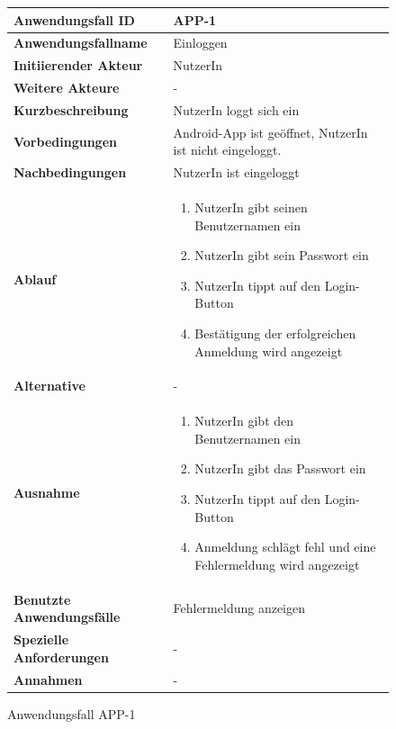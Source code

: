 \newpage

\begin{figure}[h]
	\centering
	\begin{tabularx}{\textwidth}{ X | X }
		\textbf{Anwendungsfall ID} & APP-1 \\ \hline
		\textbf{Anwendungsfallname} & Einloggen \\ \hline
		\textbf{Initiierender Akteur} & NutzerIn \\ \hline
		\textbf{Weitere Akteure} & -  \\ \hline
		\textbf{Kurzbeschreibung} & NutzerIn loggt sich ein \\ \hline
		\textbf{Vorbedingungen} & Android-App ist geöffnet, NutzerIn ist nicht eingeloggt. \\ \hline
		\textbf{Nachbedingungen} & NutzerIn ist eingeloggt \\ \hline
		\textbf{Ablauf} &
			\begin{enumerate}
				\item NutzerIn gibt seinen Benutzernamen ein
				\item NutzerIn gibt sein Passwort ein
				\item NutzerIn tippt auf den Login-Button
				\item Bestätigung der erfolgreichen Anmeldung wird angezeigt
			\end{enumerate} \\ \hline
		\textbf{Alternative} &
				- \\ \hline
		\textbf{Ausnahme} &
				\begin{enumerate}
					\item NutzerIn gibt den Benutzernamen ein
					\item NutzerIn gibt das Passwort ein
					\item NutzerIn tippt auf den Login-Button
					\item Anmeldung schlägt fehl und eine Fehlermeldung wird angezeigt
				\end{enumerate}  \\ \hline
		\textbf{Benutzte Anwendungsfälle} & Fehlermeldung anzeigen \\ \hline
		\textbf{Spezielle Anforderungen} & - \\ \hline
		\textbf{Annahmen} & -
	\end{tabularx}
	\caption{Anwendungsfall APP-1}
	\label{fig:anwendungsfall-app-tabelle-APP-1}
\end{figure}

\newpage

